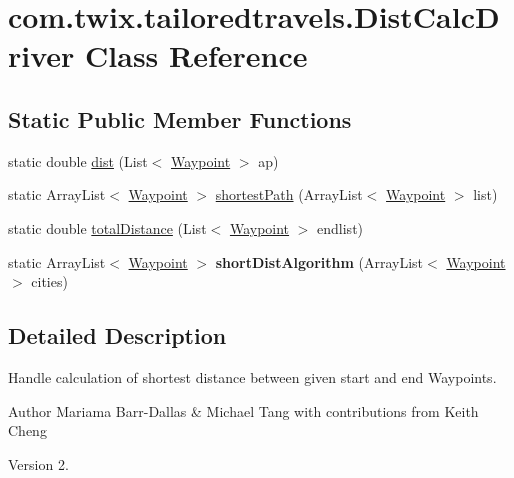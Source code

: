 \hypertarget{classcom_1_1twix_1_1tailoredtravels_1_1_dist_calc_driver}{\section{com.\-twix.\-tailoredtravels.\-Dist\-Calc\-Driver Class Reference}
\label{classcom_1_1twix_1_1tailoredtravels_1_1_dist_calc_driver}
}
\subsection*{Static Public Member Functions}
\begin{DoxyCompactItemize}
\item 
static double \hyperlink{classcom_1_1twix_1_1tailoredtravels_1_1_dist_calc_driver_ac157f7fde2a521a42b6d8c743d61c75c}{dist} (List$<$ \hyperlink{classcom_1_1twix_1_1tailoredtravels_1_1_waypoint}{Waypoint} $>$ ap)
\item 
static Array\-List$<$ \hyperlink{classcom_1_1twix_1_1tailoredtravels_1_1_waypoint}{Waypoint} $>$ \hyperlink{classcom_1_1twix_1_1tailoredtravels_1_1_dist_calc_driver_a98c2ee80127771fac65d05793883e6c0}{shortest\-Path} (Array\-List$<$ \hyperlink{classcom_1_1twix_1_1tailoredtravels_1_1_waypoint}{Waypoint} $>$ list)
\item 
static double \hyperlink{classcom_1_1twix_1_1tailoredtravels_1_1_dist_calc_driver_a6064db847d42f19c8e159e8cd3c9ebdd}{total\-Distance} (List$<$ \hyperlink{classcom_1_1twix_1_1tailoredtravels_1_1_waypoint}{Waypoint} $>$ endlist)
\item 
\hypertarget{classcom_1_1twix_1_1tailoredtravels_1_1_dist_calc_driver_ad866a4bf497d195874a00d66f7f1c4f4}{static Array\-List$<$ \hyperlink{classcom_1_1twix_1_1tailoredtravels_1_1_waypoint}{Waypoint} $>$ {\bfseries short\-Dist\-Algorithm} (Array\-List$<$ \hyperlink{classcom_1_1twix_1_1tailoredtravels_1_1_waypoint}{Waypoint} $>$ cities)}\label{classcom_1_1twix_1_1tailoredtravels_1_1_dist_calc_driver_ad866a4bf497d195874a00d66f7f1c4f4}

\end{DoxyCompactItemize}


\subsection{Detailed Description}
Handle calculation of shortest distance between given start and end Waypoints.

\begin{DoxyAuthor}{Author}
Mariama Barr-\/\-Dallas \& Michael Tang with contributions from Keith Cheng 
\end{DoxyAuthor}
\begin{DoxyVersion}{Version}
2. 
\end{DoxyVersion}


